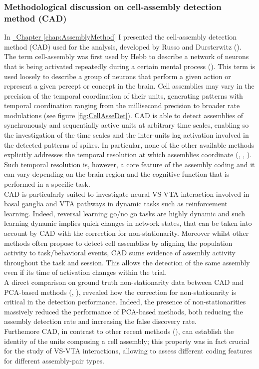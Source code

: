 \subsubsection{Methodological discussion on cell-assembly detection method (CAD)}
In \hyperref[chap:AssemblyMethod]{~Chapter \ref*{chap:AssemblyMethod}} I presented the cell-assembly detection method (CAD) used for the analysis, developed by Russo and Dursterwitz (\cite{RussoDurstewitz}). The term cell-assembly was first used by Hebb to describe a network of neurons that is being activated repeatedly during a certain mental process (\cite{Hebb}). This term is used loosely to describe a group of neurons that perform a given action or represent a given percept or concept in the brain. Cell assemblies may vary in the precision of  the temporal coordination of their units, generating patterns with  temporal coordination ranging from  the  millisecond precision to broader rate modulations (see figure \ref{fig:CellAsseDet}). CAD is able to detect assemblies of synchronously and sequentially active units at arbitrary time scales, enabling so the investigation of the time scales and the inter-units lag activation involved in the detected patterns of spikes. In particular, none of the other available methods explicitly addresses the temporal resolution at which assemblies coordinate (\cite{Gruen}, \cite{Tavoni}, \cite{Billeh}). Such temporal resolution is, however, a core feature of the assembly coding and it can vary depending on the brain region and the cognitive function that is performed in a specific task.\\CAD is particularly suited to investigate neural VS-VTA interaction involved in basal ganglia and VTA pathways in dynamic tasks such as reinforcement learning. Indeed, reversal learning go/no go tasks are highly dynamic and such learning dynamic implies quick changes in network states, that can be taken into account by CAD with the correction for non-stationarity. Moreover whilst other methods often propose to detect cell assemblies by aligning the population activity to task/behavioral events, CAD sums evidence of assembly activity throughout the task and session. This allows the detection of the same assembly even if its time of activation changes within the trial.\\A direct comparison on ground truth non-stationarity data between CAD and PCA-based methods (\cite{Lopes}, \cite{RussoDurstewitz}), revealed how the correction for non-stationarity is critical in the detection performance. Indeed, the presence of non-stationarities massively reduced the performance of PCA-based methods, both reducing the assembly detection rate and increasing the false discovery rate.\\Furthemore CAD, in contrast to other recent methods (\cite{Watanabe2019}), can establish the identity of the units composing a cell assembly; this property was in fact crucial for the study of VS-VTA interactions, allowing to assess different coding features for different assembly-pair types.
